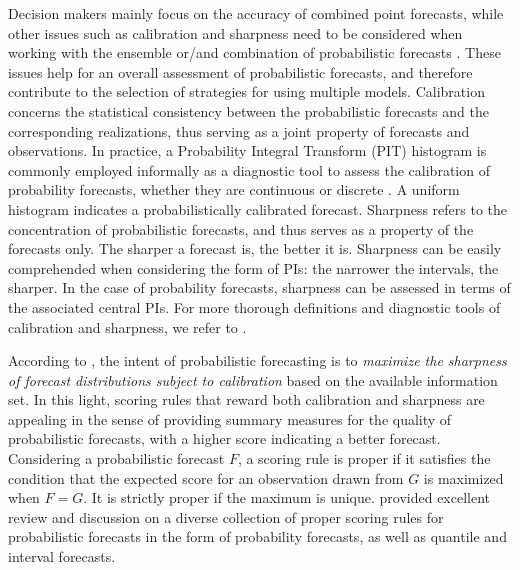 \documentclass[11pt]{article}
\begin{document}
Decision makers mainly focus on the accuracy of combined point forecasts, while other issues such as calibration and sharpness need to be considered when working with the ensemble or/and combination of probabilistic forecasts \citep{Gneiting2007-fr,Gneiting2007-ij,Lahiri2015-qq}. These issues help for an overall assessment of probabilistic forecasts, and therefore contribute to the selection of strategies for using multiple models. Calibration concerns the statistical consistency between the probabilistic forecasts and the corresponding realizations, thus serving as a joint property of forecasts and observations. In practice, a Probability Integral Transform (PIT) histogram is commonly employed informally as a diagnostic tool to assess the calibration of probability forecasts, whether they are continuous \citep{Dawid1984-vp,Diebold1997-cr} or discrete \citep{Gneiting2013-hl}. A uniform histogram indicates a probabilistically calibrated forecast. Sharpness refers to the concentration of probabilistic forecasts, and thus serves as a property of the forecasts only. The sharper a forecast is, the better it is. Sharpness can be easily comprehended when considering the form of PIs: the narrower the intervals, the sharper. In the case of probability forecasts, sharpness can be assessed in terms of the associated central PIs. For more thorough definitions and diagnostic tools of calibration and sharpness, we refer to \cite{Gneiting2014-tz}.

According to \cite{Gneiting2007-fr}, the intent of probabilistic forecasting is to \textit{maximize the sharpness of forecast distributions subject to calibration} based on the available information set. In this light, scoring rules that reward both calibration and sharpness are appealing in the sense of providing summary measures for the quality of probabilistic forecasts, with a higher score indicating a better forecast. Considering a probabilistic forecast $F$, a scoring rule is proper if it satisfies the condition that the expected score for an observation drawn from $G$ is maximized when $F=G$. It is strictly proper if the maximum is unique. \cite{Gneiting2007-ij} provided excellent review and discussion on a diverse collection of proper scoring rules for probabilistic forecasts in the form of probability forecasts, as well as quantile and interval forecasts.
\end{document}
